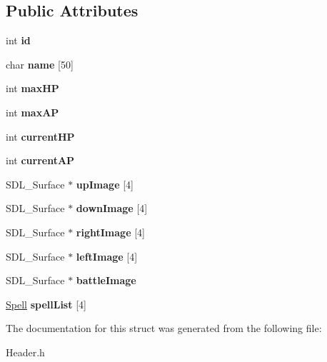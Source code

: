 \subsection*{Public Attributes}
\begin{DoxyCompactItemize}
\item 
int {\bfseries id}\hypertarget{structHero_a8e0b7a82c8ebbbb0a94cdb00d8ba52ee}{}\label{structHero_a8e0b7a82c8ebbbb0a94cdb00d8ba52ee}

\item 
char {\bfseries name} \mbox{[}50\mbox{]}\hypertarget{structHero_a947928d6a97732c9eb622c758dc00aa9}{}\label{structHero_a947928d6a97732c9eb622c758dc00aa9}

\item 
int {\bfseries max\+HP}\hypertarget{structHero_a28b2bffc01d17d1df0904169acfabac7}{}\label{structHero_a28b2bffc01d17d1df0904169acfabac7}

\item 
int {\bfseries max\+AP}\hypertarget{structHero_a42f1b98ece3101ffe87b49b4d347e1d5}{}\label{structHero_a42f1b98ece3101ffe87b49b4d347e1d5}

\item 
int {\bfseries current\+HP}\hypertarget{structHero_a7c2adb58fafd935f013847a9383ab755}{}\label{structHero_a7c2adb58fafd935f013847a9383ab755}

\item 
int {\bfseries current\+AP}\hypertarget{structHero_a9970c3ae5e2bbf99060dfd062f3739fc}{}\label{structHero_a9970c3ae5e2bbf99060dfd062f3739fc}

\item 
S\+D\+L\+\_\+\+Surface $\ast$ {\bfseries up\+Image} \mbox{[}4\mbox{]}\hypertarget{structHero_a37717fa64696425f7af82f37cb6dca62}{}\label{structHero_a37717fa64696425f7af82f37cb6dca62}

\item 
S\+D\+L\+\_\+\+Surface $\ast$ {\bfseries down\+Image} \mbox{[}4\mbox{]}\hypertarget{structHero_a0082a2d40be4239acb9fd602bcc85585}{}\label{structHero_a0082a2d40be4239acb9fd602bcc85585}

\item 
S\+D\+L\+\_\+\+Surface $\ast$ {\bfseries right\+Image} \mbox{[}4\mbox{]}\hypertarget{structHero_a861267c33724070c1f9d50c9e4f5d94e}{}\label{structHero_a861267c33724070c1f9d50c9e4f5d94e}

\item 
S\+D\+L\+\_\+\+Surface $\ast$ {\bfseries left\+Image} \mbox{[}4\mbox{]}\hypertarget{structHero_a15b94881c772aad2443f64104bb799ce}{}\label{structHero_a15b94881c772aad2443f64104bb799ce}

\item 
S\+D\+L\+\_\+\+Surface $\ast$ {\bfseries battle\+Image}\hypertarget{structHero_af12606b16996c2118f0deb3808926d64}{}\label{structHero_af12606b16996c2118f0deb3808926d64}

\item 
\hyperlink{structSpell}{Spell} {\bfseries spell\+List} \mbox{[}4\mbox{]}\hypertarget{structHero_ae17ce17d4329b5a22de4a1a929efe76d}{}\label{structHero_ae17ce17d4329b5a22de4a1a929efe76d}

\end{DoxyCompactItemize}


The documentation for this struct was generated from the following file\+:\begin{DoxyCompactItemize}
\item 
Header.\+h\end{DoxyCompactItemize}
